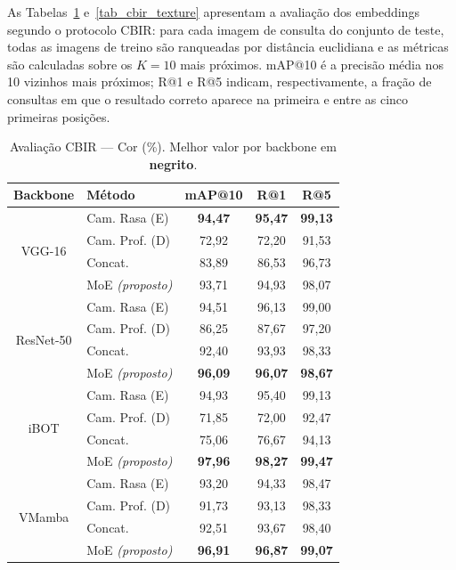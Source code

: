 \documentclass[letterpaper, 10 pt, conference]{ieeeconf}
\begin{document}
As Tabelas~\ref{tab_cbir_color} e~\ref{tab_cbir_texture} apresentam a
avaliação dos embeddings segundo o protocolo CBIR: para cada imagem de
consulta do conjunto de teste, todas as imagens de treino são ranqueadas
por distância euclidiana e as métricas são calculadas sobre os
$K\!=\!10$ mais próximos.
mAP@10 é a precisão média nos 10 vizinhos mais próximos; R@1 e R@5
indicam, respectivamente, a fração de consultas em que o resultado
correto aparece na primeira e entre as cinco primeiras posições.

\begin{table}[htbp]
\caption{Avaliação CBIR — Cor (\%). Melhor valor por backbone em
         \textbf{negrito}.}
\begin{center}
\begin{tabular}{c|l|c|c|c}
\hline
\textbf{Backbone} & \textbf{Método} & \textbf{mAP@10}
                  & \textbf{R@1} & \textbf{R@5} \\
\hline
\multirow{4}{*}{VGG-16}
  & Cam. Rasa (E)           & \textbf{94,47} & \textbf{95,47} & \textbf{99,13} \\
  & Cam. Prof. (D)          & 72,92 & 72,20 & 91,53 \\
  & Concat.                 & 83,89 & 86,53 & 96,73 \\
  & MoE \textit{(proposto)} & 93,71 & 94,93 & 98,07 \\
\hline
\multirow{4}{*}{ResNet-50}
  & Cam. Rasa (E)           & 94,51 & 96,13 & 99,00 \\
  & Cam. Prof. (D)          & 86,25 & 87,67 & 97,20 \\
  & Concat.                 & 92,40 & 93,93 & 98,33 \\
  & MoE \textit{(proposto)} & \textbf{96,09} & \textbf{96,07} & \textbf{98,67} \\
\hline
\multirow{4}{*}{iBOT}
  & Cam. Rasa (E)           & 94,93 & 95,40 & 99,13 \\
  & Cam. Prof. (D)          & 71,85 & 72,00 & 92,47 \\
  & Concat.                 & 75,06 & 76,67 & 94,13 \\
  & MoE \textit{(proposto)} & \textbf{97,96} & \textbf{98,27} & \textbf{99,47} \\
\hline
\multirow{4}{*}{VMamba}
  & Cam. Rasa (E)           & 93,20 & 94,33 & 98,47 \\
  & Cam. Prof. (D)          & 91,73 & 93,13 & 98,33 \\
  & Concat.                 & 92,51 & 93,67 & 98,40 \\
  & MoE \textit{(proposto)} & \textbf{96,91} & \textbf{96,87} & \textbf{99,07} \\
\hline
\end{tabular}
\label{tab_cbir_color}
\end{center}
\end{table}
\end{document}
